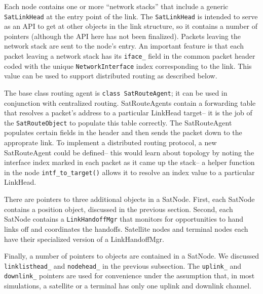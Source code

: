 Each node contains one or more ``network stacks'' that include a generic
{\tt SatLinkHead} at the entry point of the link.  The {\tt SatLinkHead}
is intended to serve as an API to get at other objects in the link structure,
so it contains a number of pointers (although the API here has not been
finalized).  Packets leaving the network stack are sent to the node's
entry.  An important feature is that each packet leaving a network stack
has its {\tt iface\_} field in the common packet header coded with the
unique {\tt NetworkInterface} index corresponding to the link.  This value
can be used to support distributed routing as described below.

The base class routing agent is {\tt class SatRouteAgent}; it can be used 
in conjunction with centralized routing.  SatRouteAgents contain
a forwarding table that resolves a packet's address to a particular 
LinkHead target-- it is the job of the {\tt SatRouteObject} to populate this
table correctly.  The SatRouteAgent populates certain fields in the header
and then sends the packet down to the approprate link.  To implement
a distributed routing protocol, a new SatRouteAgent could be defined-- this
would learn about topology by noting the interface index marked in each 
packet as it came up the stack-- a helper function in the node 
{\tt intf\_to\_target()} allows it to resolve an index value to
a particular LinkHead. 

There are pointers to three additional objects in a SatNode.  First,
each SatNode contains a position object, discussed in the previous section.
Second, each SatNode contains a {\tt LinkHandoffMgr} that monitors
for opportunities to hand links off and coordinates the handoffs.  Satellite
nodes and terminal nodes each have their specialized version of a 
LinkHandoffMgr.

Finally, a number of pointers to objects are contained in a SatNode.  We
discussed {\tt linklisthead\_} and {\tt nodehead\_} in the previous 
subsection.  The {\tt uplink\_} and {\tt downlink\_} pointers are
used for convenience under the assumption that, in most simulations,
a satellite or a terminal has only one uplink and downlink channel.

